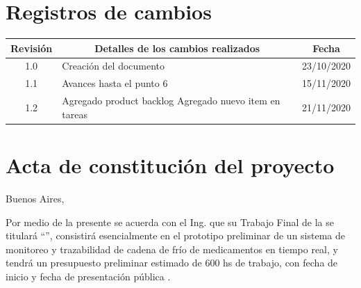 \documentclass[11pt]{charter}
\begin{document}
\maketitle
\thispagestyle{empty}
\pagebreak


\thispagestyle{empty}
{\setlength{\parskip}{0pt}
\tableofcontents{}
}
\pagebreak


\section{Registros de cambios}
\label{sec:registro}


\begin{table}[ht]
\label{tab:registro}
\centering
\begin{tabularx}{\linewidth}{@{}|c|X|c|@{}}
\hline
\rowcolor[HTML]{C0C0C0} 
Revisión & \multicolumn{1}{c|}{\cellcolor[HTML]{C0C0C0}Detalles de los cambios realizados} & Fecha      \\ \hline
1.0      & Creación del documento                                          & 23/10/2020 \\ \hline
1.1      & Avances hasta el punto 6                                           & 15/11/2020 \\ \hline
1.2      & Agregado product backlog \newline Agregado nuevo item en tareas  & 21/11/2020 \\ \hline
\end{tabularx}
\end{table}

\pagebreak



\section{Acta de constitución del proyecto}
\label{sec:acta}

\begin{flushright}
Buenos Aires, \fechaInicioName
\end{flushright}

\vspace{2cm}

Por medio de la presente se acuerda con el Ing. \authorname\hspace{1px} que su Trabajo Final de la \degreename\hspace{1px} se titulará ``\ttitle'', consistirá esencialmente en el prototipo preliminar de un sistema de monitoreo y trazabilidad de cadena de frío de medicamentos en tiempo real, y tendrá un presupuesto preliminar estimado de 600 hs de trabajo, con fecha de inicio \fechaInicioName\hspace{1px} y fecha de presentación pública \fechaFinalName.
\end{document}
